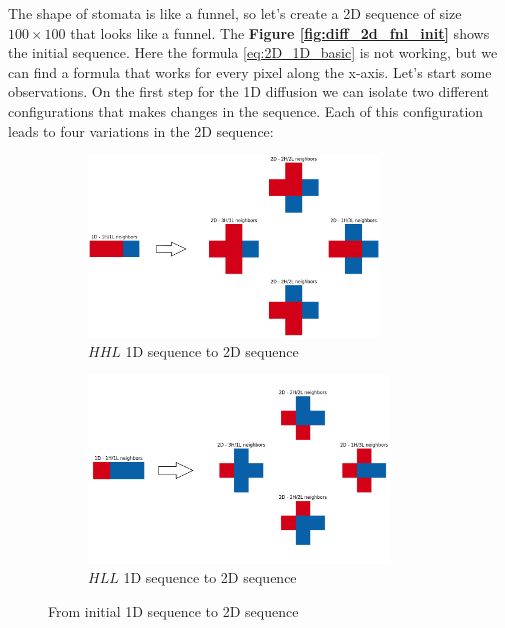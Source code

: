 The shape of stomata is like a funnel, so let's create a 2D sequence of size $100 
\times 100$ that looks like a funnel. The \textbf{Figure \ref{fig:diff_2d_fnl_init}} shows the 
initial sequence. Here the formula \eqref{eq:2D_1D_basic} is not working, but we can find
a formula that works for every pixel along the x-axis. Let's start some observations. 
On the first step  for the 1D diffusion we can isolate two different configurations that 
makes changes in the sequence. Each of this configuration leads to four variations in the 
2D sequence:

\begin{figure}[ht]
    \centering
    \begin{subfigure}[b]{1\textwidth}
        \centering
        \includegraphics[width=0.85\textwidth]{figures/HHL_1D_to_2D.png}
        \caption{$HHL$ 1D sequence to 2D sequence}
        \label{fig:HHL_1D_to_2D}
    \end{subfigure}
    \hfill
    \begin{subfigure}[b]{1\textwidth}
        \centering
        \includegraphics[width=0.88\textwidth]{figures/HLL_1D_to_2D.png}
        \caption{$HLL$ 1D sequence to 2D sequence}
        \label{fig:HLL_1D_to_2D}
    \end{subfigure}
    \caption{From initial 1D sequence to 2D sequence}
    \label{fig:1D_to_2D}
\end{figure}

